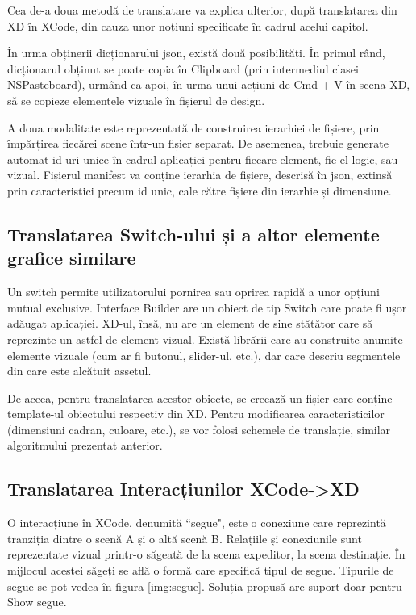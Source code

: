 Cea de-a doua metodă de translatare va explica ulterior, după translatarea din XD în XCode, din cauza unor noțiuni specificate în cadrul acelui capitol.

În urma obținerii dicționarului json, există două posibilități. În primul rând, dicționarul obținut se poate copia în Clipboard (prin intermediul clasei NSPasteboard), urmând ca apoi, în urma unui acțiuni de Cmd + V în scena XD, să se copieze elementele vizuale în fișierul de design.

A doua modalitate este reprezentată de construirea ierarhiei de fișiere, prin împărțirea fiecărei scene într-un fișier separat. De asemenea, trebuie generate automat id-uri unice în cadrul aplicației pentru fiecare element, fie el logic, sau vizual. Fișierul manifest va conține ierarhia de fișiere, descrisă în json, extinsă prin caracteristici precum id unic, cale către fișiere din ierarhie și dimensiune.



\subsection{Translatarea Switch-ului și a altor elemente grafice similare}

Un switch permite utilizatorului pornirea sau oprirea rapidă a unor opțiuni mutual exclusive. 
Interface Builder are un obiect de tip Switch care poate fi ușor adăugat aplicației. XD-ul, însă, nu are un element de sine stătător care să reprezinte un astfel de element vizual. Există librării care au construite anumite elemente vizuale (cum ar fi butonul, slider-ul, etc.), dar care descriu segmentele din care este alcătuit assetul. 

De aceea, pentru translatarea acestor obiecte, se creează un fișier care conține template-ul obiectului respectiv din XD. Pentru modificarea caracteristicilor (dimensiuni cadran, culoare, etc.), se vor folosi schemele de translație, similar algoritmului prezentat anterior.

\subsection{Translatarea Interacțiunilor XCode->XD}

O interacțiune în XCode, denumită ``segue", este o conexiune care reprezintă tranziția dintre o scenă A și o altă scenă B. Relațiile și conexiunile sunt reprezentate vizual printr-o săgeată de la scena expeditor, la scena destinație. În mijlocul acestei săgeți se află o formă care specifică tipul de segue. Tipurile de segue se pot vedea în figura \ref{img:segue}. Soluția propusă are suport doar pentru Show segue.

